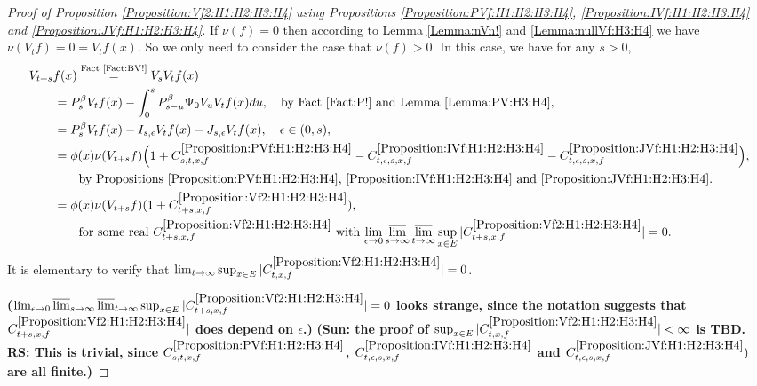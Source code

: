 \documentclass[12pt,a4paper]{amsart}
\numberwithin{equation}{section}
\theoremstyle{plain}
\theoremstyle{definition}
\theoremstyle{remark}
\newcounter{N}
\newcounter{n}[N]
\begin{document}
\begin{proof}[{Proof of Proposition \ref{Proposition:Vf2:H1:H2:H3:H4} using Propositions \ref{Proposition:PVf:H1:H2:H3:H4}, \ref{Proposition:IVf:H1:H2:H3:H4} and \ref{Proposition:JVf:H1:H2:H3:H4}}]
If $\nu(f)=0$ then according to Lemma \ref{Lemma:nVn!} and \ref{Lemma:nullVf:H3:H4} we have $\nu(V_tf) =0= V_tf(x)$.
So we only need to consider the case that $\nu(f)>0$.
In this case, we have for any $s>0$,
\begin{align}
 \MoveEqLeft V_{t+s}f (x)
	\overset{\text{Fact \ref{Fact:BV!}}}= V_s V_t f(x)
 \\&= P_s^\beta V_t f(x) - \int_0^s P^\beta_{s-u}\Psi_0 V_uV_t f(x) du, \quad\text{by Fact \ref{Fact:P!} and Lemma \ref{Lemma:PV:H3:H4}},
 \\&= P_s^\beta V_t f(x) - I_{s,\epsilon} V_tf(x) - J_{s,\epsilon} V_t f(x), \quad \epsilon\in (0,s),
 \\&=\phi(x)\nu(V_{t+s}f) \Big( 1+ C^{\ref{Proposition:PVf:H1:H2:H3:H4}}_{s,t,x,f} - C^{\ref{Proposition:IVf:H1:H2:H3:H4}}_{t,\epsilon, s, x,f}- C^{\ref{Proposition:JVf:H1:H2:H3:H4}}_{t,\epsilon,s,x,f}\Big),
 \\&\qquad \text{by Propositions \ref{Proposition:PVf:H1:H2:H3:H4}, \ref{Proposition:IVf:H1:H2:H3:H4} and \ref{Proposition:JVf:H1:H2:H3:H4}}.
 \\& = \phi(x) \nu(V_{t+s}f) (1+ C^{\ref{Proposition:Vf2:H1:H2:H3:H4}}_{t+s,x,f}),
 \\& \qquad \text{for some real $C^{\ref{Proposition:Vf2:H1:H2:H3:H4}}_{t+s,x,f}$ with $\lim_{\epsilon \to 0}\varlimsup_{s\to \infty}\varlimsup_{t\to \infty}\sup_{x\in E}|C^{\ref{Proposition:Vf2:H1:H2:H3:H4}}_{t+s,x,f}|=0$}.
 \end{align}
It is elementary to verify that $\lim_{t\to \infty} \sup_{x\in E}|C^{\ref{Proposition:Vf2:H1:H2:H3:H4}}_{t,x,f}|=0$.

{\bf ($\lim_{\epsilon \to 0}\varlimsup_{s\to \infty}\varlimsup_{t\to \infty}\sup_{x\in E}|C^{\ref{Proposition:Vf2:H1:H2:H3:H4}}_{t+s,x,f}|=0$ looks strange, since the notation suggests that  $C^{\ref{Proposition:Vf2:H1:H2:H3:H4}}_{t+s,x,f}|$ does depend on $\epsilon$.)}
{\bf (Sun: the proof  of $\sup_{x\in E}|C_{t,x,f}^{\ref{Proposition:Vf2:H1:H2:H3:H4}}| < \infty$ is TBD. RS: This is trivial, since $C^{\ref{Proposition:PVf:H1:H2:H3:H4}}_{s,t,x,f}$, $C^{\ref{Proposition:IVf:H1:H2:H3:H4}}_{t,\epsilon, s, x,f}$ and $ C^{\ref{Proposition:JVf:H1:H2:H3:H4}}_{t,\epsilon,s,x,f})$ are all finite.)}
\end{proof}
\end{document}
